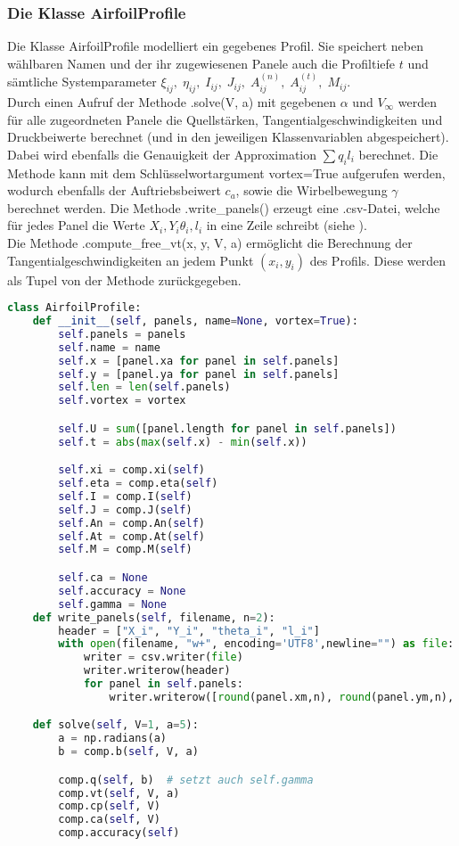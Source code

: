 \subsubsection{Die Klasse AirfoilProfile}
Die Klasse AirfoilProfile modelliert ein gegebenes Profil. Sie speichert neben wählbaren Namen und der ihr zugewiesenen Panele auch die Profiltiefe $t$ und sämtliche Systemparameter $\xi_{ij}, \; \eta_{ij}, \; I_{ij}, \; J_{ij}, \; A_{ij}^{(n)}, \;A_{ij}^{(t)}, \;M_{ij}$. \\
Durch einen Aufruf der Methode .solve(V, a) mit gegebenen $\alpha $ und $V_{\infty}$ werden für alle zugeordneten Panele die Quellstärken, Tangentialgeschwindigkeiten und Druckbeiwerte berechnet (und in den jeweiligen Klassenvariablen abgespeichert). Dabei wird ebenfalls die Genauigkeit der Approximation $\sum q_i l_i$ berechnet. Die Methode kann mit dem Schlüsselwortargument vortex=True aufgerufen werden, wodurch ebenfalls der Auftriebsbeiwert $c_a$, sowie die Wirbelbewegung $\gamma$ \\ berechnet werden.
Die Methode .write\_panels() erzeugt eine .csv-Datei, welche für jedes Panel die Werte $X_i, Y_i \theta_i, l_i$ in eine Zeile schreibt (siehe ). \\
Die Methode .compute\_free\_vt(x, y, V, a) ermöglicht die Berechnung der Tangentialgeschwindigkeiten an jedem Punkt $(x_i, y_i)$ des Profils. Diese werden als Tupel von der Methode zurückgegeben.
\begin{lstlisting}[language=Python]
class AirfoilProfile:
    def __init__(self, panels, name=None, vortex=True):
        self.panels = panels
        self.name = name
        self.x = [panel.xa for panel in self.panels]
        self.y = [panel.ya for panel in self.panels]
        self.len = len(self.panels)
        self.vortex = vortex

        self.U = sum([panel.length for panel in self.panels])
        self.t = abs(max(self.x) - min(self.x))

        self.xi = comp.xi(self)
        self.eta = comp.eta(self)
        self.I = comp.I(self)
        self.J = comp.J(self)
        self.An = comp.An(self)
        self.At = comp.At(self)
        self.M = comp.M(self)

        self.ca = None
        self.accuracy = None
        self.gamma = None
    def write_panels(self, filename, n=2):
        header = ["X_i", "Y_i", "theta_i", "l_i"]
        with open(filename, "w+", encoding='UTF8',newline="") as file:
            writer = csv.writer(file)
            writer.writerow(header)
            for panel in self.panels:
                writer.writerow([round(panel.xm,n), round(panel.ym,n), round(panel.theta*180/np.pi,n), round(panel.length,n)])

    def solve(self, V=1, a=5):
        a = np.radians(a)
        b = comp.b(self, V, a)

        comp.q(self, b)  # setzt auch self.gamma
        comp.vt(self, V, a)
        comp.cp(self, V)
        comp.ca(self, V)
        comp.accuracy(self)
\end{lstlisting}

